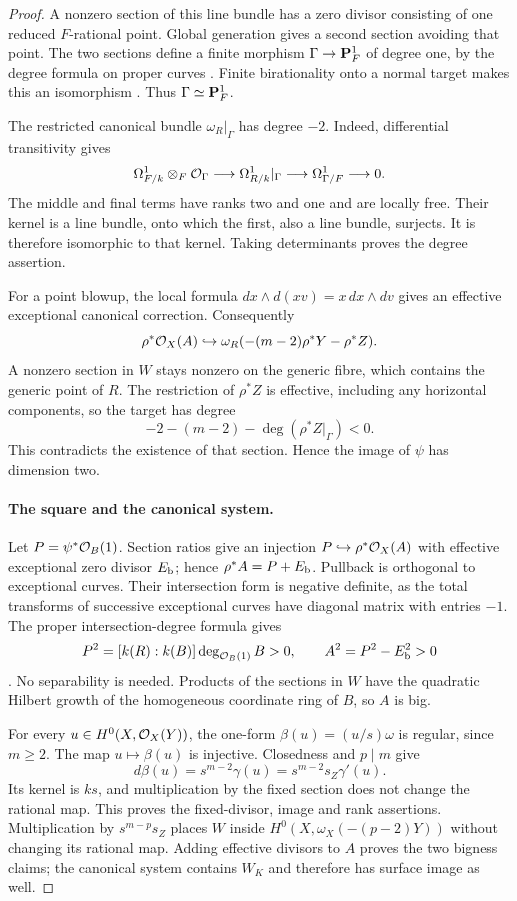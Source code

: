 \begin{proof}
A nonzero section of this line bundle has a zero divisor consisting
of one reduced $F$-rational point. Global generation gives a second
section avoiding that point. The two sections define a finite morphism
$\Gamma\to\mathbf P^1_F$ of degree one, by the degree formula on proper curves
\cite[Lemma~37.44.1, Tag~02LS; Lemma~33.44.11, Tag~0AYQ]{Stacks}.
Finite birationality onto a normal target makes this an isomorphism
\cite[Lemma~29.55.8, Tag~0AB1]{Stacks}.
Thus $\Gamma\simeq\mathbf P^1_F$.

The restricted canonical bundle $\omega_R|_\Gamma$ has degree $-2$.
Indeed, differential transitivity gives
\[
 \Omega^1_{F/k}\otimes_F\mathcal O_\Gamma\longrightarrow
 \Omega^1_{R/k}|_\Gamma\longrightarrow\Omega^1_{\Gamma/F}
 \longrightarrow0.
\]
The middle and final terms have ranks two and one and are locally
free. Their kernel is a line bundle, onto which the first, also a
line bundle, surjects. It is therefore isomorphic to that kernel.
Taking determinants proves the degree assertion.

For a point blowup, the local formula
$dx\wedge d(xv)=x\,dx\wedge dv$ gives an effective exceptional
canonical correction. Consequently
\[
 \rho^*\mathcal O_X(A)\hookrightarrow
 \omega_R(-(m-2)\rho^*Y-\rho^*Z).
\]
A nonzero section in $W$ stays nonzero on the generic fibre, which
contains the generic point of $R$. The restriction of $\rho^*Z$ is
effective, including any horizontal components, so the target has
degree
\[
 -2-(m-2)-\deg(\rho^*Z|_\Gamma)<0.
\]
This contradicts the existence of that section. Hence the image of
$\psi$ has dimension two.

\paragraph{The square and the canonical system.}
Let $P=\psi^*\mathcal O_B(1)$. Section ratios give an injection
$P\hookrightarrow\rho^*\mathcal O_X(A)$ with effective exceptional zero
divisor $E_{\rm b}$; hence $\rho^*A=P+E_{\rm b}$.
Pullback is orthogonal to exceptional curves. Their intersection form
is negative definite, as the total transforms of successive exceptional
curves have diagonal matrix with entries $-1$.
The proper intersection-degree formula gives
\[
 P^2=[k(R):k(B)]\deg_{\mathcal O_B(1)}B>0,
 \qquad A^2=P^2-E_{\rm b}^2>0
\]
\cite[Section~54.3, Tag~0AGP; Lemma~33.45.7, Tag~0BEL]{Stacks}.
No separability is needed. Products of the sections in $W$ have the
quadratic Hilbert growth of the homogeneous coordinate ring of $B$,
so $A$ is big.

For every $u\in H^0(X,\mathcal O_X(Y))$, the one-form
$\beta(u)=(u/s)\omega$ is regular, since $m\geq2$.
The map $u\mapsto\beta(u)$ is injective. Closedness and $p\mid m$ give
\[
 d\beta(u)=s^{m-2}\gamma(u)=s^{m-2}s_Z\gamma'(u).
\]
Its kernel is $ks$, and multiplication by the fixed section does not
change the rational map. This proves the fixed-divisor, image and rank
assertions. Multiplication by $s^{m-p}s_Z$ places $W$ inside
$H^0(X,\omega_X(-(p-2)Y))$ without changing its rational map.
Adding effective divisors to $A$ proves the two bigness claims;
the canonical system contains $W_K$ and therefore has surface image
as well.
\end{proof}

